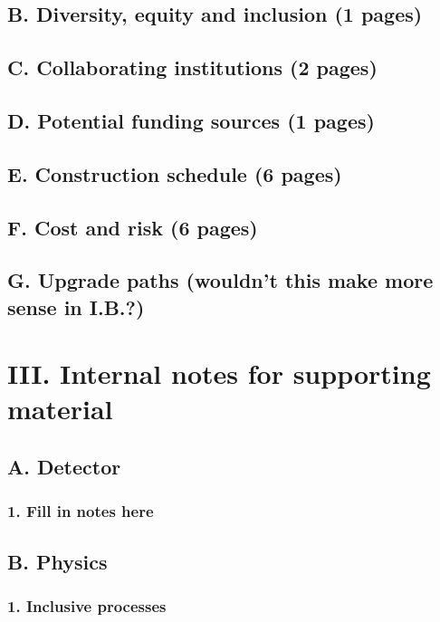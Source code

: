 \documentclass{report}
\begin{document}
\section{B. Diversity, equity and inclusion (1 pages)}
\section{C. Collaborating institutions (2 pages)}
\section{D. Potential funding sources (1 pages)}
\section{E. Construction schedule (6 pages)}
\section{F. Cost and risk (6 pages)}
\section{G. Upgrade paths (wouldn’t this make more sense in I.B.?)}
%
\chapter{III. Internal notes for supporting material}
%
\section{A. Detector}
\subsection{1. Fill in notes here}
%
\section{B. Physics}
\subsection{1. Inclusive processes}
\end{document}
